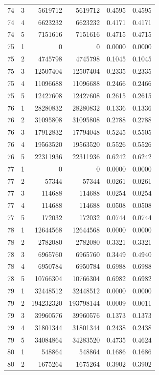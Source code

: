 \begin{longtable}{rrrrrr}
74 & 3 & 5619712 & 5619712 & 0.4595 & 0.4595 \\
74 & 4 & 6623232 & 6623232 & 0.4171 & 0.4171 \\
74 & 5 & 7151616 & 7151616 & 0.4715 & 0.4715 \\
75 & 1 & 0 & 0 & 0.0000 & 0.0000 \\
75 & 2 & 4745798 & 4745798 & 0.1045 & 0.1045 \\
75 & 3 & 12507404 & 12507404 & 0.2335 & 0.2335 \\
75 & 4 & 11096688 & 11096688 & 0.2466 & 0.2466 \\
75 & 5 & 12427608 & 12427608 & 0.2615 & 0.2615 \\
76 & 1 & 28280832 & 28280832 & 0.1336 & 0.1336 \\
76 & 2 & 31095808 & 31095808 & 0.2788 & 0.2788 \\
76 & 3 & 17912832 & 17794048 & 0.5245 & 0.5505 \\
76 & 4 & 19563520 & 19563520 & 0.5526 & 0.5526 \\
76 & 5 & 22311936 & 22311936 & 0.6242 & 0.6242 \\
77 & 1 & 0 & 0 & 0.0000 & 0.0000 \\
77 & 2 & 57344 & 57344 & 0.0261 & 0.0261 \\
77 & 3 & 114688 & 114688 & 0.0254 & 0.0254 \\
77 & 4 & 114688 & 114688 & 0.0508 & 0.0508 \\
77 & 5 & 172032 & 172032 & 0.0744 & 0.0744 \\
78 & 1 & 12644568 & 12644568 & 0.0000 & 0.0000 \\
78 & 2 & 2782080 & 2782080 & 0.3321 & 0.3321 \\
78 & 3 & 6965760 & 6965760 & 0.3449 & 0.4940 \\
78 & 4 & 6950784 & 6950784 & 0.6988 & 0.6988 \\
78 & 5 & 10766304 & 10766304 & 0.6982 & 0.6982 \\
79 & 1 & 32448512 & 32448512 & 0.0000 & 0.0000 \\
79 & 2 & 194232320 & 193798144 & 0.0009 & 0.0011 \\
79 & 3 & 39960576 & 39960576 & 0.1373 & 0.1373 \\
79 & 4 & 31801344 & 31801344 & 0.2438 & 0.2438 \\
79 & 5 & 34084864 & 34283520 & 0.4735 & 0.4624 \\
80 & 1 & 548864 & 548864 & 0.1686 & 0.1686 \\
80 & 2 & 1675264 & 1675264 & 0.3902 & 0.3902 \\

\end{longtable}

